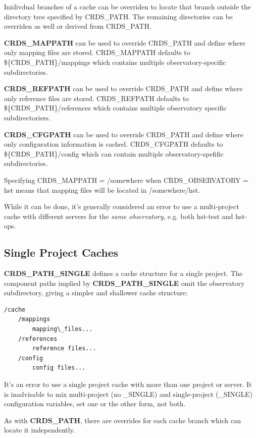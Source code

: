 \documentclass[letterpaper,10pt,english]{sphinxmanual}
\begin{document}
Inidivdual branches of a cache can be overriden to locate that branch outside the directory
tree specified by CRDS\_PATH.   The remaining directories can be overriden as well or derived
from CRDS\_PATH.

\textbf{CRDS\_MAPPATH} can be used to override CRDS\_PATH and define where
only mapping files are stored.  CRDS\_MAPPATH defaults to \$\{CRDS\_PATH\}/mappings
which contains multiple observatory-specific subdirectories.

\textbf{CRDS\_REFPATH} can be used to override CRDS\_PATH and define where
only reference files are stored.  CRDS\_REFPATH defaults to \$\{CRDS\_PATH\}/references
which contains multiple observatory specific subdirectoriers.

\textbf{CRDS\_CFGPATH} can be used to override CRDS\_PATH and define where
only configuration information is cached. CRDS\_CFGPATH defaults to \$\{CRDS\_PATH\}/config
which can contain multiple observatory-spefific subdirectories.

Specifying CRDS\_MAPPATH = /somewhere when CRDS\_OBSERVATORY = hst means that
mapping files will be located in /somewhere/hst.

While it can be done,  it's generally considered an error to use a multi-project cache
with different servers for the \emph{same observatory}, e.g. both hst-test and hst-ops.


\subsection{Single Project Caches}
\label{installation:single-project-caches}
\textbf{CRDS\_PATH\_SINGLE} defines a cache structure for a single project.  The component paths
implied by \textbf{CRDS\_PATH\_SINGLE}  omit the observatory subdirectory,  giving a simpler and
shallower cache structure:

\begin{Verbatim}[commandchars=\\\{\}]
/cache
    /mappings
        mapping\_files...
    /references
        reference files...
    /config
        config files...
\end{Verbatim}

It's an error to use a single project cache with more than one project or server.  It is
inadvisable to mix multi-project (no \_SINGLE) and single-project (\_SINGLE) configuration
variables,  set one or the other form,  not both.

As with \textbf{CRDS\_PATH},  there are overrides for each cache branch which can locate it
independently.
\end{document}
